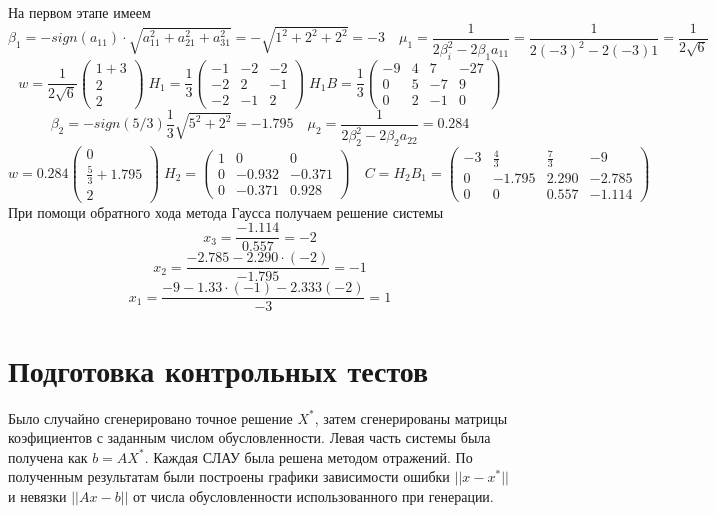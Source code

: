 \documentclass[11pt,a4paper]{article}
\begin{document}
На первом этапе имеем \[
  \beta_{1} = -sign(a_{11})\cdot\sqrt{a_{11}^{2}+a_{21}^{2}+a_{31}^{2}} = - \sqrt{1^{2} + 2^{2} + 2^{2}} = -3 \quad
  \mu_{1} = \frac{1}{2\beta_{i}^{2} - 2\beta_{1}a_{11}} = \frac{1}{2(-3)^{2} - 2(-3)1} = \frac{1}{2\sqrt{6}}
\]\[
  w = \frac{1}{2\sqrt{6}}\begin{pmatrix}
    1 + 3\\ 2 \\ 2
  \end{pmatrix} \; H_{1} = \frac{1}{3} \begin{pmatrix}
    -1 & -2 & -2\\
    -2 &  2 & -1\\
    -2 & -1 & 2
  \end{pmatrix} \; H_{1}B = \frac{1}{3} \left(
    \begin{array}{ccc|c}
      -9 & 4 & 7 & -27\\
      0 & 5 & -7& 9\\
      0 & 2 & -1& 0
    \end{array}
  \right)
\]\[
  \beta_{2} = -sign(5/3)\frac{1}{3}\sqrt{5^{2}+ 2^{2}} = -1.795 \quad \mu_{2} = \frac{1}{2\beta^{2}_{2} - 2\beta_{2}a_{22}} = 0.284
\]\[
  w = 0.284\begin{pmatrix}
    0 \\ \frac{5}{3} + 1.795 \\ 2
\end{pmatrix} \; H_{2} = \begin{pmatrix}
  1 & 0 & 0\\
  0 & -0.932 & -0.371 \\
  0 & -0.371 & 0.928
\end{pmatrix} \quad C = H_{2}B_{1} = \left(
    \begin{array}{ccc|c}
      -3 & \frac{4}{3} & \frac{7}{3} & -9\\
      0 & -1.795 & 2.290& -2.785\\
      0 & 0 & 0.557& -1.114
    \end{array}
  \right)
\]
При помощи обратного хода метода Гаусса получаем решение системы \[
  x_{3} = \frac{-1.114}{0.557} = -2
\]\[
  x_{2} = \frac{-2.785 - 2.290\cdot(-2)}{-1.795} = -1
\]\[
  x_{1} = \frac{-9 - 1.33\cdot(-1) - 2.333(-2)}{-3} = 1
\]
\section{Подготовка контрольных тестов}
Было случайно сгенерировано точное решение $X^{*}$, затем сгенерированы матрицы коэфициентов с заданным числом обусловленности. Левая часть системы была получена как $b = AX^{*}$. Каждая СЛАУ была решена методом отражений.
По полученным результатам были построены графики зависимости ошибки $||x-x^{*}||$ и невязки $||Ax - b||$ от числа обусловленности использованного при генерации.
\end{document}
